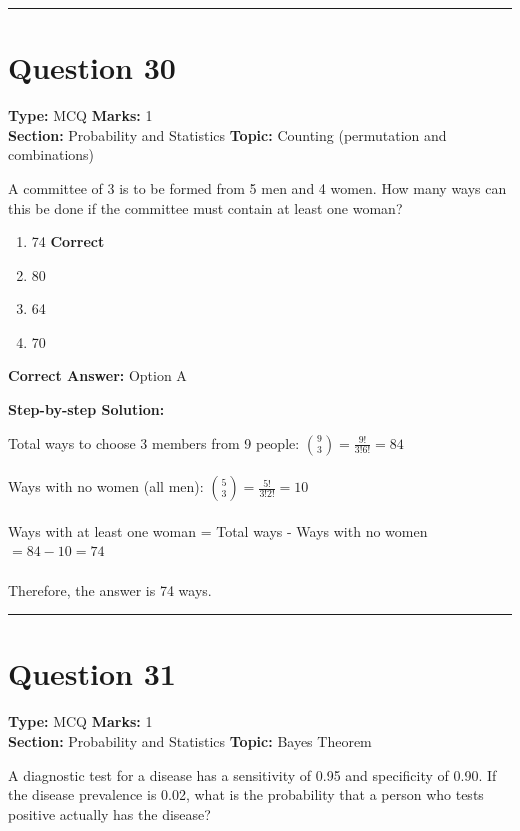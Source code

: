 \documentclass[11pt]{article}
\begin{document}
\vspace{0.8em}
\hrule
\vspace{0.4em}
\section*{Question 30}
\textbf{Type:} MCQ \hfill \textbf{Marks:} 1\\
\textbf{Section:} Probability and Statistics \hfill \textbf{Topic:} Counting (permutation and combinations)

A committee of 3 is to be formed from 5 men and 4 women. How many ways can this be done if the committee must contain at least one woman?


\begin{enumerate}[label=\textbf{\Alph*.}, leftmargin=1.8em]
\item 74 \hfill {\color{gategreen}\textbf{Correct}}\item 80\item 64\item 70\end{enumerate}

\textbf{Correct Answer:} Option A

\textbf{Step-by-step Solution:}

Total ways to choose 3 members from 9 people: \(\binom{9}{3} = \frac{9!}{3!6!} = 84\) \\
\\
Ways with no women (all men): \(\binom{5}{3} = \frac{5!}{3!2!} = 10\) \\
\\
Ways with at least one woman = Total ways - Ways with no women \\
\(= 84 - 10 = 74\) \\
\\
Therefore, the answer is 74 ways.

\vspace{0.8em}
\hrule
\vspace{0.4em}
\section*{Question 31}
\textbf{Type:} MCQ \hfill \textbf{Marks:} 1\\
\textbf{Section:} Probability and Statistics \hfill \textbf{Topic:} Bayes Theorem

A diagnostic test for a disease has a sensitivity of 0.95 and specificity of 0.90. If the disease prevalence is 0.02, what is the probability that a person who tests positive actually has the disease?
\end{document}
